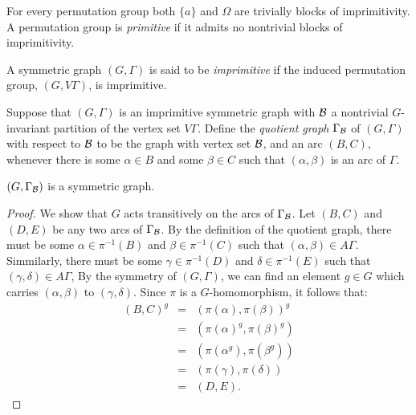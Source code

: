For every permutation group both $\{a\}$ and $\Omega$ are 
trivially blocks of imprimitivity. A permutation group is \emph{primitive}
if it admits no nontrivial blocks of imprimitivity.

\begin{definition} 
A symmetric graph $(G,\Gamma)$ is said to be {\it imprimitive} if
the induced permutation group, $(G, V \Gamma)$, is imprimitive.
\end{definition}

\begin{definition} 
Suppose that $(G,\Gamma)$ is an imprimitive symmetric graph
with $\mathcal{B}$ a nontrivial $G$-invariant partition of the vertex set $V \Gamma$.
Define the {\it quotient graph} $\Gamma_{\mathcal{B}}$ of $(G,\Gamma)$ with respect to $\mathcal{B}$
to be the graph with vertex set $\mathcal{B}$, and an arc $(B,C)$,
whenever there is some $\alpha \in B$ 
and some $\beta \in C$ 
such that  $(\alpha, \beta )$ is an arc of $\Gamma$.
\end{definition}

\begin{proposition}
$(G, \Gamma_{\mathcal{B}})$ is a symmetric graph.

\begin{proof}
We show that $G$ acts transitively on the arcs of $\Gamma_{\mathcal{B}}$.
Let $(B,C)$ and $(D,E)$ be any two arcs of $\Gamma_{\mathcal{B}}$.
By the definition of the quotient graph,
there must be some $\alpha \in \pi^{-1}(B)$ 
and $\beta \in \pi^{-1}(C)$
such that $(\alpha, \beta) \in A \Gamma$.
Simmilarly, there must be some $\gamma \in \pi^{-1}(D)$ 
and $\delta \in \pi^{-1}(E)$
such that $(\gamma, \delta) \in A \Gamma$,
By the symmetry of $(G, \Gamma)$, we can find an element $g \in G$
which carries  $(\alpha,\beta)$ to $(\gamma,\delta)$.
Since $\pi$ is a $G$-homomorphism, it follows that:
\begin{eqnarray*}
(B,C)^g & = & (\pi(\alpha),\pi(\beta))^g \\
        & = & (\pi(\alpha)^g,\pi(\beta)^g) \\
	& = & (\pi(\alpha^g),\pi(\beta^g)) \\
        & = & (\pi(\gamma),\pi(\delta)) \\
	& = & (D,E).
\end{eqnarray*}
\end{proof}
\end{proposition}

